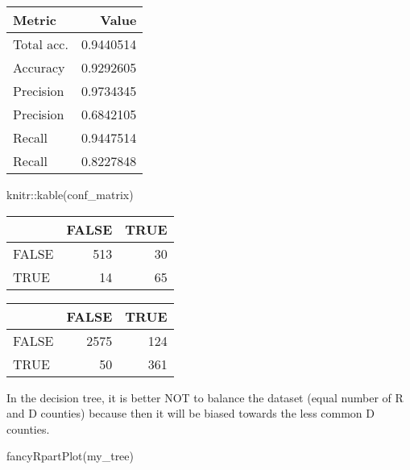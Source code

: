 \documentclass[
]{article}
\newenvironment{Shaded}{\begin{snugshade}}{\end{snugshade}}
\newcommand{\AttributeTok}[1]{\textcolor[rgb]{0.77,0.63,0.00}{#1}}
\newcommand{\CommentTok}[1]{\textcolor[rgb]{0.56,0.35,0.01}{\textit{#1}}}
\newcommand{\FunctionTok}[1]{\textcolor[rgb]{0.00,0.00,0.00}{#1}}
\newcommand{\NormalTok}[1]{#1}
\newcommand{\OtherTok}[1]{\textcolor[rgb]{0.56,0.35,0.01}{#1}}
\newcommand{\SpecialCharTok}[1]{\textcolor[rgb]{0.00,0.00,0.00}{#1}}
\newcommand{\StringTok}[1]{\textcolor[rgb]{0.31,0.60,0.02}{#1}}
\begin{document}
\begin{longtable}[]{@{}lr@{}}
\toprule
Metric & Value \\
\midrule
\endhead
Total acc. & 0.9440514 \\
Accuracy & 0.9292605 \\
Precision & 0.9734345 \\
Precision & 0.6842105 \\
Recall & 0.9447514 \\
Recall & 0.8227848 \\
\bottomrule
\end{longtable}

\begin{Shaded}
\begin{Highlighting}[]
\NormalTok{knitr}\SpecialCharTok{::}\FunctionTok{kable}\NormalTok{(conf\_matrix)}
\end{Highlighting}
\end{Shaded}

\begin{longtable}[]{@{}lrr@{}}
\toprule
& FALSE & TRUE \\
\midrule
\endhead
FALSE & 513 & 30 \\
TRUE & 14 & 65 \\
\bottomrule
\end{longtable}

\begin{Shaded}
\end{Shaded}

\begin{longtable}[]{@{}lrr@{}}
\toprule
& FALSE & TRUE \\
\midrule
\endhead
FALSE & 2575 & 124 \\
TRUE & 50 & 361 \\
\bottomrule
\end{longtable}

In the decision tree, it is better NOT to balance the dataset (equal
number of R and D counties) because then it will be biased towards the
less common D counties.

\begin{Shaded}
\begin{Highlighting}[]
\FunctionTok{fancyRpartPlot}\NormalTok{(my\_tree)}
\end{Highlighting}
\end{Shaded}
\end{document}

